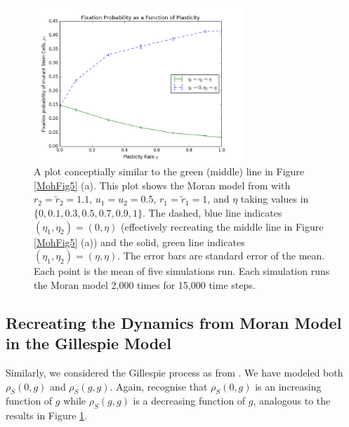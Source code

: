 \documentclass[12pt]{article}
\begin{document}
\begin{figure}[!ht]
\begin{center}
\includegraphics[width=0.7\textwidth]{moh_both.png}
\end{center}
\caption{A plot conceptially similar to the green (middle) line in Figure \ref{MohFig5} (a). This plot shows the Moran model from \cite{mohammad} with $r_2=\tilde{r}_2=1.1$, $u_1=u_2=0.5$, $r_1=\tilde{r}_1=1$, and $\eta$ taking values in $\{0, 0.1, 0.3, 0.5, 0.7, 0.9, 1\}$. The dashed, blue line indicates $(\eta_1, \eta_2)=(0,\eta)$ (effectively recreating the middle line in Figure \ref{MohFig5} (a)) and the solid, green line indicates $(\eta_1, \eta_2)=(\eta, \eta)$. The error bars are standard error of the mean. Each point is the mean of five simulations run. Each simulation runs the Moran model 2,000 times for 15,000 time steps. }\label{mohBothInc}
\end{figure}

\subsection{Recreating the Dynamics from Moran Model in the Gillespie Model}
Similarly, we considered the Gillespie process as from \cite{gillespie}. We have modeled both $\rho_S(0, g)$ and $\rho_S(g, g)$. Again, recognise that $\rho_S(0, g)$ is an increasing function of $g$ while $\rho_S(g, g)$ is a decreasing function of $g$, analogous to the results in Figure \ref{mohBothInc}.
\end{document}
